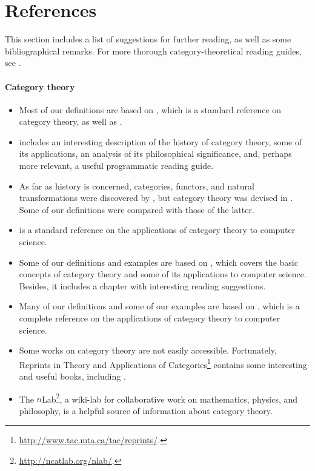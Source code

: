 \section{References}
\label{sec:introduction-references}

This section includes a list of suggestions for further reading, as
well as some bibliographical remarks. For more thorough
category-theoretical reading guides, see
\parencites[48--56]{marquis-2013}[§ 4]{pierce-1991}.

\paragraph{Category theory}

\begin{itemize}
\item
  Most of our definitions are based on \parencite{maclane-1998}, which
  is a standard reference on category theory, as well as
  \parencite{awodey-2010}.

\item
  \textcite{marquis-2013} includes an interesting description of the
  history of category theory, some of its applications, an analysis of
  its philosophical significance, and, perhaps more relevant, a useful
  programmatic reading guide.

\item
  As far as history is concerned, categories, functors, and natural
  transformations were discovered by
  \textcite{eilenberg-maclane-1942}, but category theory was devised
  in \parencite{eilenberg-maclane-1945}. Some of our definitions were
  compared with those of the latter.

\item
  \textcite{bird-demoor-1997} is a standard reference on the
  applications of category theory to computer science.

\item
  Some of our definitions and examples are based on
  \parencite{pierce-1991}, which covers the basic concepts of category
  theory and some of its applications to computer science. Besides, it
  includes a chapter with interesting reading suggestions.

\item
  Many of our definitions and some of our examples are based on
  \parencite{poigne-1992}, which is a complete reference on the
  applications of category theory to computer science.

\item
  Some works on category theory are not easily accessible.
  Fortunately, Reprints in Theory and Applications of
  Categories\footnote{\url{http://www.tac.mta.ca/tac/reprints/}.}
  contains some interesting and useful books, including
  \parencites{adamek-et-al-2006}{barr-wells-2005}{barr-wells-2012}.

\item
  The $n$Lab\footnote{\url{http://ncatlab.org/nlab/}.}, a wiki-lab for
  collaborative work on mathematics, physics, and philosophy, is a
  helpful source of information about category theory.

\end{itemize}

